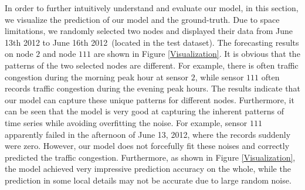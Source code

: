 \documentclass[sigconf, nonacm]{acmart}
\begin{document}
In order to further intuitively understand and evaluate our model, in this section, we visualize the prediction of our model and the {\color{black}ground-truth}.
Due to space limitations, we randomly selected two nodes and displayed their data from June 13th 2012 to June 16th 2012~({\color{black}located} in the test dataset).
The forecasting results on node $2$ and node $111$ are shown in Figure \ref{Visualization}.
It is obvious that the patterns of the two selected nodes are different.
For example, there is often traffic congestion during the morning peak hour at sensor $2$, while sensor $111$ often records traffic congestion during the evening peak hours.
The results indicate that our model can capture these unique patterns for different nodes.
Furthermore, it can be seen that the model is very good at capturing the inherent patterns of time series while avoiding overfitting the noise.
For example, sensor $111$ apparently failed in the afternoon of June 13, 2012, where the records suddenly were zero. 
{\color{black}However,} our model does not forcefully fit these noises and correctly predicted the traffic congestion.
Furthermore, as shown in Figure \ref{Visualization}, the model achieved very impressive prediction accuracy on the whole, while the prediction in some local details may not be accurate due to large random noise.
\end{document}
